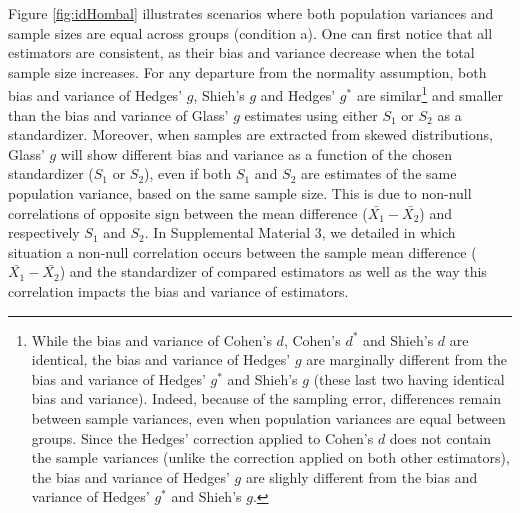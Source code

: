 \documentclass[
  english,
  man,floatsintext]{apa6}
\begin{document}
Figure \ref{fig:idHombal} illustrates scenarios where both population variances and sample sizes are equal across groups (condition a). One can first notice that all estimators are consistent, as their bias and variance decrease when the total sample size increases. For any departure from the normality assumption, both bias and variance of Hedges' \(g\), Shieh's \(g\) and Hedges' \(g^*\) are similar\footnote{While the bias and variance of Cohen's $d$, Cohen's $d^*$ and Shieh's $d$ are identical, the bias and variance of Hedges' $g$ are marginally different from the bias and variance of Hedges' $g^*$ and Shieh's $g$ (these last two having identical bias and variance). Indeed, because of the sampling error, differences remain between sample variances, even when population variances are equal between groups. Since the Hedges' correction applied to Cohen's $d$ does not contain the sample variances (unlike the correction applied on both other estimators), the bias and variance of Hedges' $g$ are slighly different from the bias and variance of Hedges' $g^*$ and Shieh's $g$.} and smaller than the bias and variance of Glass' \(g\) estimates using either \(S_1\) or \(S_2\) as a standardizer. Moreover, when samples are extracted from skewed distributions, Glass' \(g\) will show different bias and variance as a function of the chosen standardizer (\(S_1\) or \(S_2\)), even if both \(S_1\) and \(S_2\) are estimates of the same population variance, based on the same sample size. This is due to non-null correlations of opposite sign between the mean difference (\(\bar{X_1}-\bar{X_2}\)) and respectively \(S_1\) and \(S_2\). In Supplemental Material 3, we detailed in which situation a non-null correlation occurs between the sample mean difference (\(\bar{X_1}-\bar{X_2}\)) and the standardizer of compared estimators as well as the way this correlation impacts the bias and variance of estimators.
\end{document}
